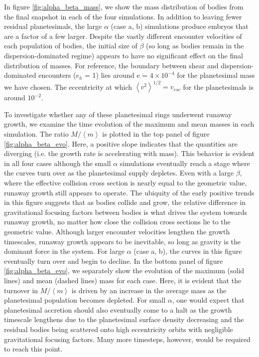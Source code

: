 In figure \ref{fig:alpha_beta_mass}, we show the mass distribution of bodies from the final snapshot in each of the four simulations. In addition to 
leaving fewer residual planetesimals, the large $\alpha$ (case a, b) simulations produce embryos that are a factor of a few larger. Despite the 
vastly different encounter velocities of each population of bodies, the initial size of $\beta$ (so long as bodies remain in the dispersion-dominated regime) 
appears to have no significant effect on the final distribution of masses. For reference, the boundary between shear and dispersion-dominated 
encounters ($e_{h}$ = 1) lies around e = $4 \times 10^{-4}$ for the planetesimal mass we have chosen. The eccentricity at which $\left< v^{2} \right>^{1/2} = 
v_{esc}$ for the planetesimals is around $10^{-2}$.

To investigate whether any of these planetesimal rings underwent
runaway growth, we examine the time evolution of the maximum and mean
masses in each simulation. The ratio $M/\left< m \right>$ is plotted
in the top panel of figure \ref{fig:alpha_beta_evo}. Here, a positive slope
indicates that the quantities are diverging (i.e.
the growth rate is accelerating with mass). This behavior is
evident in all four cases although the small $\alpha$ simulations eventually reach a stage where the curves
 turn over as the planetesimal supply depletes. Even with a large
$\beta$, where the effective collision cross section is
 nearly equal to the geometric value, runaway growth still appears to
operate. The ubiquity of the early positive trends in this figure suggests
that as bodies collide and grow, the
relative difference in gravitational focusing factors between bodies
is what drives the system towards runaway
growth, no matter how close the collision cross sections lie to the geometric value.
Although larger encounter velocities lengthen the growth
timescales, runaway growth appears to be inevitable, so long as
gravity is the dominant force in the system. For large $\alpha$
(case a, b), the curves in this figure eventually turn over and begin to decline.
In the bottom panel of figure \ref{fig:alpha_beta_evo}, we separately show the evolution of
the maximum (solid lines) and mean (dashed lines) mass for each case. Here, it is evident
that the turnover in $M/\left< m \right>$ is
driven by an increase in the average mass as the planetesimal population
becomes depleted. For small $\alpha$, one would expect that planetesimal accretion should also eventually come to a halt as
the growth timescale lengthens due to the planetesimal surface density decreasing and the residual bodies being scattered onto high
eccentricity orbits with negligible gravitational focusing factors. Many more timesteps, however, would be required to reach this point.

